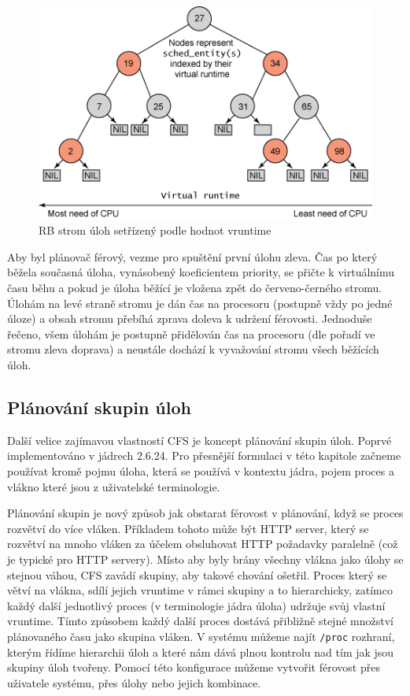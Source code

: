 \documentclass[
  master=true,
  font=sans,
  printversion=false,
  joinlists=true,
  figures=true,
  tables=true,
  sourcecodes=false,
  theorems=false,
  bibencoding=utf8,
  language=czech,
  encoding=utf8,
  field=ainfk,
  biblatex,
  glossaries,
  index
]{kidiplom}
\begin{document}
\begin{figure}[ht]
\includegraphics[scale=1]{obrazky/RBT_virtual_runtime.png}
\caption{RB strom úloh setřízený podle hodnot vruntime}
\label{RB vruntime}
\end{figure}


Aby byl plánovač férový, vezme pro spuštění první úlohu zleva. Čas po který běžela současná úloha, vynásobený koeficientem priority, se přičte k virtuálnímu času běhu a pokud je úloha běžící je vložena zpět do červeno-černého stromu. Úlohám na levé straně stromu je dán čas na procesoru (postupně vždy po jedné úloze) a obsah stromu přebíhá zprava doleva k udržení férovosti. Jednoduše řečeno, všem úlohám je postupně přidělován čas na procesoru (dle pořadí ve stromu zleva doprava) a neustále dochází k vyvažování stromu všech běžících úloh.

\newpage
\subsection{Plánování skupin úloh}

Další velice zajímavou vlastností CFS je koncept plánování skupin úloh. Poprvé implementováno v jádrech 2.6.24. 
Pro přesnější formulaci v této kapitole začneme používat kromě pojmu úloha, která se používá v kontextu jádra, pojem proces a vlákno které jsou z uživatelské terminologie. 

Plánování skupin je nový způsob jak obstarat férovost v plánování, když se proces rozvětví do více vláken. Příkladem tohoto může být HTTP server, který se rozvětví na mnoho vláken za účelem obsluhovat HTTP požadavky paralelně (což je typické pro HTTP servery). Místo aby byly brány všechny vlákna jako úlohy se stejnou váhou, CFS zavádí skupiny, aby takové chování ošetřil. Proces který se větví na vlákna, sdílí jejich vruntime v rámci skupiny a to hierarchicky, zatímco každý další jednotlivý proces (v terminologie jádra úloha) udržuje svůj vlastní vruntime. Tímto způsobem každý další proces dostává přibližně stejné množství plánovaného času jako skupina vláken. V systému můžeme najít \verb#/proc# rozhraní, kterým řídíme hierarchii úloh a které nám dává plnou kontrolu nad tím jak jsou skupiny úloh tvořeny. Pomocí této konfigurace můžeme vytvořit férovost přes uživatele systému, přes úlohy nebo jejich kombinace.
\end{document}
